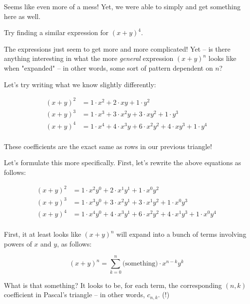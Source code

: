 Seems like even more of a mess! Yet, we were able to simply and get something here as well.

\begin{exercise}
Try finding a similar expression for $(x+y)^4$. 
\end{exercise}

\newpage

The expressions just seem to get more and more complicated! Yet -- is there anything interesting in what the more \emph{general} expression $(x+y)^n$ looks like when "expanded" -- in other words, some sort of pattern dependent on $n$? 

Let's try writing what we know slightly differently:

\begin{align*}
(x+y)^2 &= 1 \cdot x^2 + 2 \cdot xy + 1 \cdot y^2 \\
(x+y)^3 &= 1 \cdot x^3 + 3 \cdot x^2y + 3 \cdot xy^2 + 1 \cdot y^3 \\
(x+y)^4 &= 1 \cdot x^4 + 4 \cdot x^3y + 6 \cdot x^2y^2 + 4 \cdot xy^3 + 1 \cdot y^4 \\
\end{align*}

These coefficients are the exact same as rows in our previous triangle!

Let's formulate this more specifically. First, let's rewrite the above equations as follows:

\begin{align*}
(x+y)^2 &= 1 \cdot x^2 y^0 + 2 \cdot x^1 y^1 + 1 \cdot x^0 y^2 \\
(x+y)^3 &= 1 \cdot x^3 y^0 + 3 \cdot x^2 y^1 + 3 \cdot x^1 y^2 + 1 \cdot x^0 y^3 \\
(x+y)^4 &= 1 \cdot x^4 y^0 + 4 \cdot x^3 y^1 + 6 \cdot x^2 y^2 + 4 \cdot x^1 y^3 + 1 \cdot x^0 y^4 \\
\end{align*}


First, it at least looks like $(x+y)^n$ will expand into a bunch of terms involving powers of $x$ and $y$, as follows:

\begin{equation*}
(x+y)^n = \sum_{k=0}^n \text{(something)} \cdot x^{n-k} y^k
\end{equation*}

What is that something? It looks to be, for each term, the corresponding $(n,k)$ coefficient in Pascal's triangle -- in other words, $c_{n,k}$. (!)

